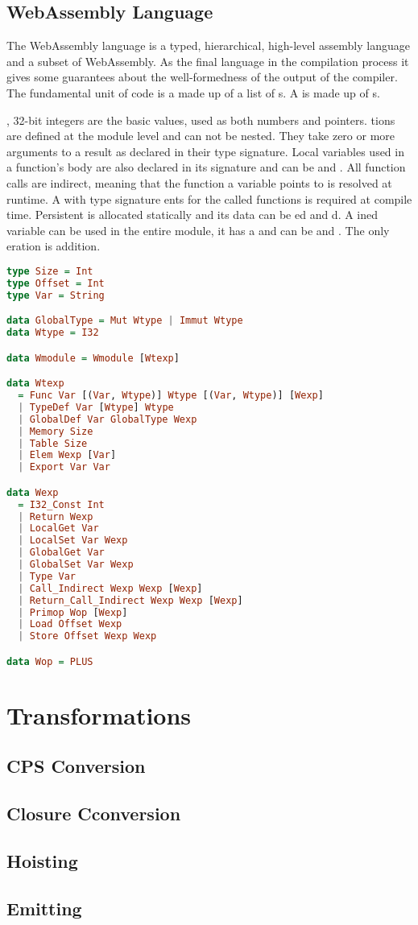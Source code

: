 \subsection{\label{subsection:webdata}WebAssembly Language}
The WebAssembly language is a typed, hierarchical, high-level assembly language and a subset of WebAssembly. As the final language in the compilation process it gives some guarantees about the well-formedness of the output of the compiler. The fundamental unit of code is a  made up of a list of s. A  is made up of s.

, 32-bit integers are the basic values, used as both numbers and pointers. tions are defined at the module level and can not be nested. They take zero or more arguments to a result as declared in their type signature. Local variables used in a function's body are also declared in its signature and can be  and . All function calls are indirect, meaning that the function a variable points to is resolved at runtime. A  with type signature ents for the called functions is required at compile time. Persistent  is allocated statically and its data can be ed and d. A ined variable can be used in the entire module, it has a  and can be  and . The only eration is addition.

\begin{lstlisting}[language=Haskell]
type Size = Int
type Offset = Int
type Var = String

data GlobalType = Mut Wtype | Immut Wtype
data Wtype = I32

data Wmodule = Wmodule [Wtexp]

data Wtexp
  = Func Var [(Var, Wtype)] Wtype [(Var, Wtype)] [Wexp]
  | TypeDef Var [Wtype] Wtype
  | GlobalDef Var GlobalType Wexp
  | Memory Size
  | Table Size
  | Elem Wexp [Var]
  | Export Var Var

data Wexp
  = I32_Const Int
  | Return Wexp
  | LocalGet Var
  | LocalSet Var Wexp
  | GlobalGet Var
  | GlobalSet Var Wexp
  | Type Var
  | Call_Indirect Wexp Wexp [Wexp]
  | Return_Call_Indirect Wexp Wexp [Wexp]
  | Primop Wop [Wexp]
  | Load Offset Wexp
  | Store Offset Wexp Wexp

data Wop = PLUS
\end{lstlisting}

\section{\label{section:transforms}Transformations}
\subsection{\label{subsection:cpsconvert}CPS Conversion}
\subsection{\label{section:closconvert}Closure Cconversion}
\subsection{\label{subsection:hoist}Hoisting}
\subsection{\label{section:emit}Emitting}
